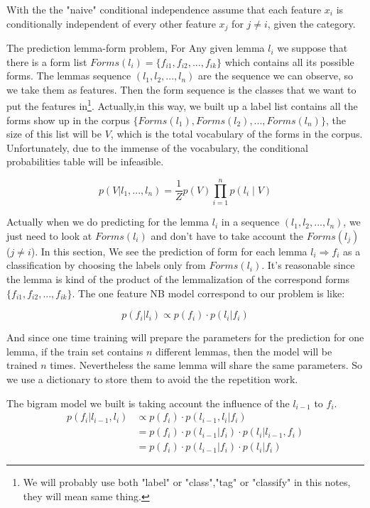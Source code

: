 \documentclass[a4paper]{article}
\begin{document}
With the the "naive" conditional independence assume that each feature $x_{i}$ is conditionally independent of every other feature $x_{j}$ for $j \neq i$, given the category. 

The prediction lemma-form problem, For Any given lemma $l_i$ we suppose that there is a form list $Forms(l_i)=\{f_{i1},f_{i2},...,f_{ik}\}$ which contains all its possible forms. The lemmas sequence $(l_1,l_2,...,l_n)$ are the sequence we can observe, so we take them as features. Then the form sequence is the classes that we want to put the features in\footnote{We will probably use both "label" or "class","tag" or "classify" in this notes, they will mean same thing.}. Actually,in this way,  we built up a label list contains all the forms show up in the corpus $\{Forms(l_1),Forms(l_2),..., Forms(l_n)\}$, the size of this list will be $V$, which is the total vocabulary of the forms in the corpus. Unfortunately, due to the immense of the vocabulary, the conditional probabilities table will be infeasible.

\[p(V|l_1,...,l_n) = \frac{1}{Z} p(V) \prod _{i=1}^{n}p(l_i \mid V) \]

Actually when we do predicting for the lemma $l_i$ in a sequence $(l_1,l_2,...,l_n)$, we just need to look at $Forms(l_i)$ and don't have to take account the $Forms(l_j)$ ($j \neq i$). In this section, We see the prediction of form for each lemma $l_i  \Longrightarrow f_i$ as a classification by choosing the labels only from $Forms(l_i)$. It's reasonable since the lemma is kind of the product of the lemmalization of the correspond forms $\{f_{i1},f_{i2},...,f_{ik}\}$. The one feature NB model correspond to our problem is like:

\[p(f_i|l_i) \propto p(f_i) \cdot  p(l_i|f_i)\]


And since one time training will prepare the parameters for the prediction for one lemma, if the train set contains $n$ different lemmas, then the model will be trained $n$ times. Nevertheless the same lemma will share the same parameters. So we use a dictionary to store them to avoid the the repetition work.


The bigram model we built is taking account the influence of the $l_{i-1}$ to $f_i$.
\begin{align}
p(f_i|l_{i-1},l_i) &\propto p(f_i) \cdot  p(l_{i-1},l_i|f_i)  \\
&= p(f_i) \cdot  p(l_{i-1}|f_i) \cdot p( l_i | l_{i-1},f_i) \label{eq:bigram_mod} \\
&= p(f_i) \cdot  p(l_{i-1}|f_i) \cdot p( l_i | f_i) \label{eq:bigram_nb}
\end{align}
\end{document}
